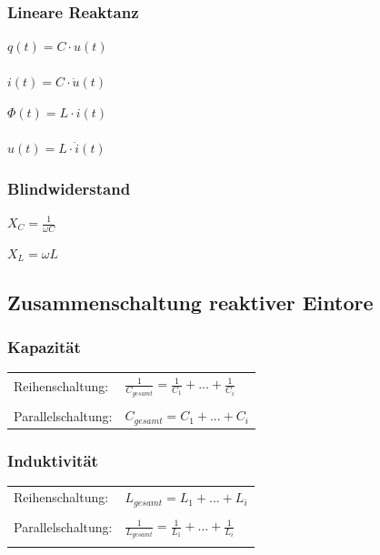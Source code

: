 \documentclass[a4paper,twocolumn,10pt]{article}
\begin{document}
\subsubsection*{Lineare Reaktanz}
\begin{minipage}[b]{0.23\textwidth}
$q(t)=C \cdot u(t)$\\\\
$i(t)=C \cdot \dot u(t)$
\end{minipage}
\hfill
\begin{minipage}[b]{0.23\textwidth}
$\Phi (t)=L\cdot i(t)$\\\\
$u(t)=L\cdot \dot i(t)$
\end{minipage}

\subsubsection*{Blindwiderstand}
\begin{minipage}[b]{0.23\textwidth}
$X_C=\frac{1}{\omega C}$
\end{minipage}
\hfill
\begin{minipage}[b]{0.23\textwidth}
$X_L=\omega L$
\end{minipage}

\subsection*{Zusammenschaltung reaktiver Eintore}
\subsubsection*{Kapazität}
\begin{tabular}{ll}
Reihenschaltung: & $\frac{1}{C_{gesamt}}=\frac{1}{C_1}+...+\frac{1}{C_i}$\\\\
Parallelschaltung: & $C_{gesamt}=C_1+...+C_i$

\end{tabular}

\subsubsection*{Induktivität}
\begin{tabular}{ll}
Reihenschaltung: & $L_{gesamt}=L_1+...+L_i$\\\\
Parallelschaltung: & $\frac{1}{L_{gesamt}}=\frac{1}{L_1}+...+\frac{1}{L_i}$\\\\
\end{tabular}
\end{document}
